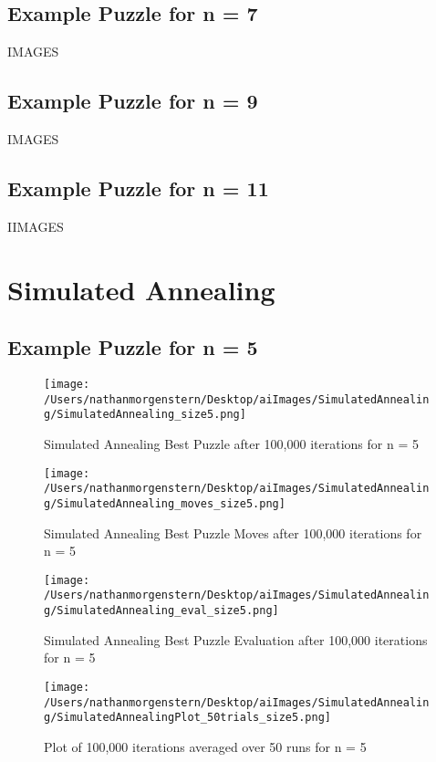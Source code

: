 \documentclass{report}
\begin{document}
\subsection{Example Puzzle for n = 7}
IMAGES
\subsection{Example Puzzle for n = 9}
IMAGES
\subsection{Example Puzzle for n = 11}
IIMAGES

\newpage
\section{Simulated Annealing}

\subsection{Example Puzzle for n = 5}

	\begin{figure}[H]
	\centering
	\texttt{[image: /Users/nathanmorgenstern/Desktop/aiImages/SimulatedAnnealing/SimulatedAnnealing\_size5.png]}
	\caption{Simulated Annealing Best Puzzle after 100,000 iterations for n = 5} 
	\label{fig: Simulated Annealing Best Puzzle after 100,000 iterations for n = 5}
	\end{figure}
	
	\begin{figure}[H]
	\centering
	\texttt{[image: /Users/nathanmorgenstern/Desktop/aiImages/SimulatedAnnealing/SimulatedAnnealing\_moves\_size5.png]}
	\caption{Simulated Annealing Best Puzzle Moves after 100,000 iterations for n = 5} 
	\label{fig: Simulated Annealing Best Puzzle Moves after 100,000 iterations for n = 5}
	\end{figure}

	\begin{figure}[H]
	\centering
	\texttt{[image: /Users/nathanmorgenstern/Desktop/aiImages/SimulatedAnnealing/SimulatedAnnealing\_eval\_size5.png]}
	\caption{Simulated Annealing Best Puzzle Evaluation after 100,000 iterations for n = 5} 
	\label{fig: Simulated Annealing Best Puzzle Evaluation after 100,000 iterations for n = 5} 
	\end{figure}

	\begin{figure}[H]
	\centering
	\texttt{[image: /Users/nathanmorgenstern/Desktop/aiImages/SimulatedAnnealing/SimulatedAnnealingPlot\_50trials\_size5.png]}
	\caption{Plot of 100,000 iterations averaged over 50 runs for n = 5}
	\label{fig: Plot of 100,000 iterations averaged over 50 runs for n = 5}
	\end{figure}
\end{document}
